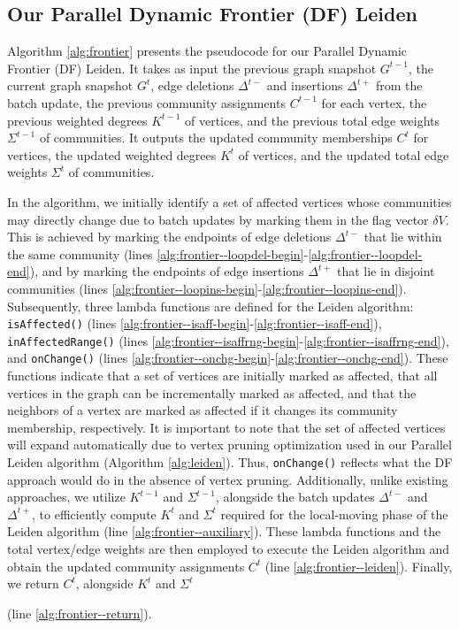 \subsection{Our Parallel Dynamic Frontier (DF) Leiden}
\label{sec:our-frontier}

Algorithm \ref{alg:frontier} presents the pseudocode for our Parallel Dynamic Frontier (DF) Leiden. It takes as input the previous graph snapshot $G^{t-1}$, the current graph snapshot $G^t$, edge deletions $\Delta^{t-}$ and insertions $\Delta^{t+}$ from the batch update, the previous community assignments $C^{t-1}$ for each vertex, the previous weighted degrees $K^{t-1}$ of vertices, and the previous total edge weights $\Sigma^{t-1}$ of communities. It outputs the updated community memberships $C^t$ for vertices, the updated weighted degrees $K^t$ of vertices, and the updated total edge weights $\Sigma^t$ of communities.



In the algorithm, we initially identify a set of affected vertices whose communities may directly change due to batch updates by marking them in the flag vector $\delta V$. This is achieved by marking the endpoints of edge deletions $\Delta^{t-}$ that lie within the same community (lines \ref{alg:frontier--loopdel-begin}-\ref{alg:frontier--loopdel-end}), and by marking the endpoints of edge insertions $\Delta^{t+}$ that lie in disjoint communities (lines \ref{alg:frontier--loopins-begin}-\ref{alg:frontier--loopins-end}). Subsequently, three lambda functions are defined for the Leiden algorithm: \texttt{isAffected()} (lines \ref{alg:frontier--isaff-begin}-\ref{alg:frontier--isaff-end}), \texttt{inAffectedRange()} (lines \ref{alg:frontier--isaffrng-begin}-\ref{alg:frontier--isaffrng-end}), and \texttt{onChange()} (lines \ref{alg:frontier--onchg-begin}-\ref{alg:frontier--onchg-end}). These functions indicate that a set of vertices are initially marked as affected, that all vertices in the graph can be incrementally marked as affected, and that the neighbors of a vertex are marked as affected if it changes its community membership, respectively. It is important to note that the set of affected vertices will expand automatically due to vertex pruning optimization used in our Parallel Leiden algorithm (Algorithm \ref{alg:leiden}). Thus, \texttt{onChange()} reflects what the DF approach would do in the absence of vertex pruning. Additionally, unlike existing approaches, we utilize $K^{t-1}$ and $\Sigma^{t-1}$, alongside the batch updates $\Delta^{t-}$ and $\Delta^{t+}$, to efficiently compute $K^t$ and $\Sigma^t$ required for the local-moving phase of the Leiden algorithm (line \ref{alg:frontier--auxiliary}). These lambda functions and the total vertex/edge weights are then employed to execute the Leiden algorithm and obtain the updated community assignments $C^t$ (line \ref{alg:frontier--leiden}). Finally, we return $C^t$, alongside $K^t$ and $\Sigma^t$ (line \ref{alg:frontier--return}).




